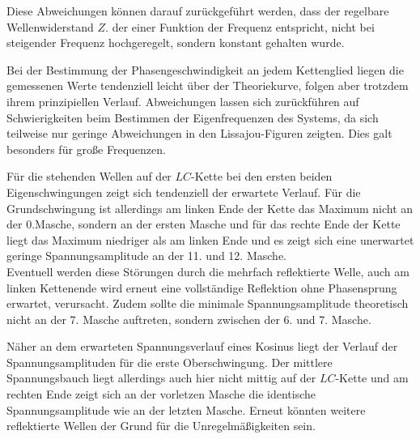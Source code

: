 Diese Abweichungen können darauf zurückgeführt werden, dass der regelbare Wellenwiderstand $Z$. 
der einer Funktion der Frequenz entspricht, nicht bei steigender Frequenz hochgeregelt, 
sondern konstant gehalten wurde.

Bei der Bestimmung der Phasengeschwindigkeit an jedem Kettenglied liegen die gemessenen Werte tendenziell leicht über der Theoriekurve, folgen aber trotzdem ihrem prinzipiellen Verlauf.
Abweichungen lassen sich  zurückführen auf Schwierigkeiten beim Bestimmen der Eigenfrequenzen des Systems, da sich teilweise nur geringe Abweichungen in den Lissajou-Figuren zeigten.
Dies galt besonders für große Frequenzen.

Für die stehenden Wellen auf der $LC$-Kette bei den ersten beiden Eigenschwingungen zeigt sich tendenziell der erwartete Verlauf.
Für die Grundschwingung ist allerdings am linken Ende der Kette das Maximum nicht an der 0.Masche, sondern an der ersten Masche und für das rechte Ende der Kette liegt das Maximum niedriger als am linken Ende und es zeigt sich eine unerwartet geringe Spannungsamplitude an der 11. und 12. Masche.\\
Eventuell werden diese Störungen durch die mehrfach reflektierte Welle, auch am linken Kettenende wird erneut eine vollständige Reflektion ohne Phasensprung erwartet, verursacht.
Zudem sollte die minimale Spannungsamplitude theoretisch nicht an der 7. Masche auftreten, sondern zwischen der 6. und 7. Masche.

Näher an dem erwarteten Spannungsverlauf eines Kosinus liegt der Verlauf der Spannungsamplituden für die erste Oberschwingung.
Der mittlere Spannungsbauch liegt allerdings auch hier nicht mittig auf der $LC$-Kette und am rechten Ende zeigt sich an der vorletzen Masche die identische Spannungsamplitude wie an der letzten Masche.
Erneut könnten weitere reflektierte Wellen der Grund für die Unregelmäßigkeiten sein.
